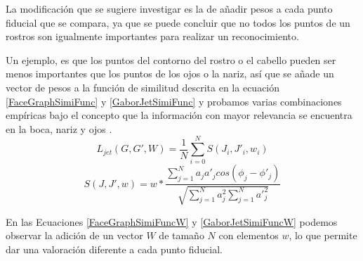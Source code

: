 La modificación que se sugiere investigar es la de añadir pesos a cada punto fiducial que se compara, ya que se puede concluir que no todos los puntos de un rostros son igualmente importantes para realizar un reconocimiento. 

Un ejemplo, es que los puntos del contorno del rostro o el cabello pueden ser menos importantes que los puntos de los ojos o la nariz, así que se añade un vector de pesos a la función de similitud descrita en la ecuación \ref{FaceGraphSimiFunc} y \ref{GaborJetSimiFunc} y probamos varias combinaciones empíricas bajo el concepto que la información con mayor relevancia se encuentra en la boca, nariz y ojos .
\begin{equation}
\label{FaceGraphSimiFuncW}
L_{jet}(G,G',W)=\frac{1}{N}\sum_{i=0}^{N}S(J_{i},J'_{i},w_{i})
\end{equation}
\begin{equation}
\label{GaborJetSimiFuncW}
S(J,J',w)=w*\frac{\sum_{j=1}^{N}a_j a'_jcos(\phi_j-\phi'_j)}{\sqrt{\sum_{j=1}^{N}a_j^2 \sum_{j=1}^{N}{a'}_j^2}}
\end{equation}

En las Ecuaciones \ref{FaceGraphSimiFuncW} y \ref{GaborJetSimiFuncW} podemos observar la adición de un vector $W$ de tamaño $N$ con elementos $w$, lo que permite dar una valoración diferente a cada punto fiducial.

